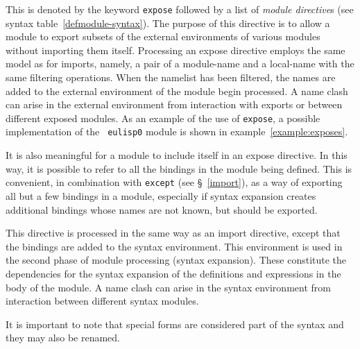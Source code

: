 %
\begin{optDefinition}
This is denoted by the keyword {\tt expose} followed by a list of {\em module
    directive\/}s (see syntax table~\ref{defmodule-syntax}).  The purpose of this
directive is to allow a module to export subsets of the external environments of
various modules without importing them itself.  Processing an expose directive
employs the same model as for imports, namely, a pair of a module-name and a
local-name with the same filtering operations.  When the namelist has been
filtered, the names are added to the external environment of the module begin
processed.  A name clash can arise in the external environment from interaction
with exports or between different exposed modules.  As an example of the use of
{\tt expose}, a possible implementation of the {\tt
    eulisp0} module is shown in
example~\ref{example:exposes}.
%
\begin{example}
\label{example:exposes}
\end{example}
%
It is also meaningful for a module to include itself in an expose
directive.  In this way, it is possible to refer to all the bindings
in the module being defined.  This is convenient, in combination with
{\tt except} (see \S~\ref{import}), as a way of exporting all but
a few bindings in a module, especially if syntax expansion creates
additional bindings whose names are not known, but should be exported.
\end{optDefinition}
%
\label{syntax-directive}
\begin{optDefinition}
This directive is processed in the same way as an import directive,
except that the bindings are added to the syntax environment.  This
environment is used in the second phase of module processing (syntax
expansion).  These constitute the dependencies for the syntax expansion
of the definitions and expressions in the body of the module.  A name
clash can arise in the syntax environment from interaction between
different syntax modules.

It is important to note that special forms are considered part of the
syntax and they may also be renamed.
\end{optDefinition}

